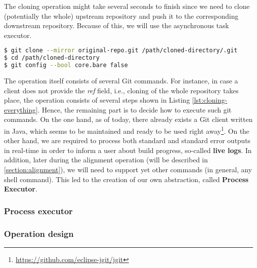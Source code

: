 \documentclass[../main.tex]{subfiles}
\begin{document}
The cloning operation might take several seconds to finish since we need to clone (potentially the whole) upstream repository and push it to the corresponding downstream repository. Because of this, we will use the asynchronous task executor.

\begin{lstlisting}[numbers=none, language=bash, label={lst:cloning-everything}, caption=Cloning the whole repository]
$ git clone --mirror original-repo.git /path/cloned-directory/.git
$ cd /path/cloned-directory
$ git config --bool core.bare false
\end{lstlisting}

The operation itself consists of several Git commands. For instance, in case a client does not provide the \textit{ref} field, i.e., cloning of the whole repository takes place, the operation consists of several steps\cite{gitfaq} shown in Listing \ref{lst:cloning-everything}. Hence, the remaining part is to decide how to execute such git commands. On the one hand, as of today, there already exists a Git client written in Java, which seems to be maintained and ready to be used right away\footnote{\url{https://github.com/eclipse-jgit/jgit}}. On the other hand, we are required to process both standard and standard error outputs in real-time in order to inform a user about build progress, so-called \textbf{live logs}. In addition, later during the alignment operation (will be described in \ref{section:alignment}), we will need to support yet other commands (in general, any shell command). This led to the creation of our own abstraction, called \textbf{Process Executor}.

\subsubsection*{Process executor}
\label{subsubsec:process-executor}


\subsubsection*{Operation design}

\end{document}
